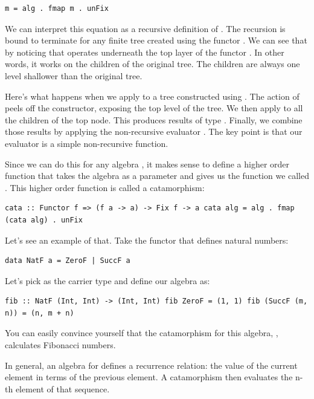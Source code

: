\begin{verbatim}
m = alg . fmap m . unFix
\end{verbatim}

We can interpret this equation as a recursive definition of .
The recursion is bound to terminate for any finite tree created using
the functor . We can see that by noticing that
 operates underneath the top layer of the functor
. In other words, it works on the children of the original
tree. The children are always one level shallower than the original
tree.

Here's what happens when we apply  to a tree constructed using
. The action of  peels off the constructor,
exposing the top level of the tree. We then apply  to all the
children of the top node. This produces results of type .
Finally, we combine those results by applying the non-recursive
evaluator . The key point is that our evaluator 
is a simple non-recursive function.

Since we can do this for any algebra , it makes sense to
define a higher order function that takes the algebra as a parameter and
gives us the function we called . This higher order function
is called a catamorphism:

\begin{verbatim}
cata :: Functor f => (f a -> a) -> Fix f -> a cata alg = alg . fmap (cata alg) . unFix
\end{verbatim}

Let's see an example of that. Take the functor that defines natural
numbers:

\begin{verbatim}
data NatF a = ZeroF | SuccF a
\end{verbatim}

Let's pick  as the carrier type and define our
algebra as:

\begin{verbatim}
fib :: NatF (Int, Int) -> (Int, Int) fib ZeroF = (1, 1) fib (SuccF (m, n)) = (n, m + n)
\end{verbatim}

You can easily convince yourself that the catamorphism for this algebra,
, calculates Fibonacci numbers.

In general, an algebra for  defines a recurrence relation:
the value of the current element in terms of the previous element. A
catamorphism then evaluates the n-th element of that sequence.

